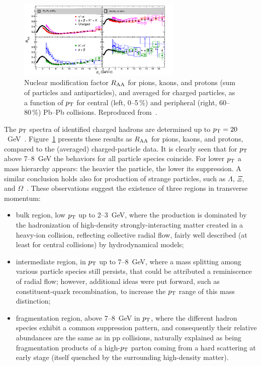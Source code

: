 \begin{figure}[!ht]
\centering
\includegraphics[width=0.7\textwidth]{particlefigs/IdentHighPtRAA.pdf}
\caption{Nuclear modification factor $R_{\rm AA}$ for pions, kaons, and protons (sum of particles and antiparticles), and averaged for charged particles, as a function of $p_{\rm T}$ for central (left, 0--5\,\%) and peripheral (right, 60--80\,\%) Pb--Pb collisions. Reproduced from~\cite{ALICEIdentHighPtRAA}.}
\label{figks:IdentPartRAA}
\end{figure}

The $p_{\rm T}$ spectra of identified charged hadrons are determined up to $p_{\rm T} = 20$~GeV~\cite{ALICEIdentHighPtRAA}. Figure~\ref{figks:IdentPartRAA} presents these results as $R_{\rm AA}$ for pions, kaons, and protons, compared to the (averaged) charged-particle data. It is clearly seen that for $p_{\rm T}$ above 7--8~GeV the behaviors for all particle species coincide. For lower $p_{\rm T}$ a mass hierarchy appears: the heavier the particle, the lower its suppression. A similar conclusion holds also for production of strange particles, such as $\Lambda$, $\Xi$, and $\Omega$~\cite{ABELEV:2013zaa,Abelev:2013xaa}. These observations suggest the existence of three regions in transverse momentum:
\begin{itemize}
    \item{bulk region, low $p_{\rm T}$ up to 2--3~GeV, where the production is dominated by the hadronization of high-density strongly-interacting matter created in a heavy-ion collision, reflecting collective radial flow, fairly well described (at least for central collisions) by hydrodynamical models;}
    \item{intermediate region, in $p_{\rm T}$ up to 7--8~GeV, where a mass splitting among various particle species still persists, that could be attributed a reminiscence of radial flow; however, additional ideas were put forward, such as constituent-quark recombination, to increase the $p_{\rm T}$ range of this mass distinction;}
    \item{fragmentation region, above 7--8~GeV in $p_{\rm T}$, where the different hadron species exhibit a common suppression pattern, and consequently their relative abundances are the same as in pp collisions, naturally explained as being fragmentation products of a high-$p_{\rm T}$ parton coming from a hard scattering at early stage (itself quenched by the surrounding high-density matter).}
\end{itemize}

